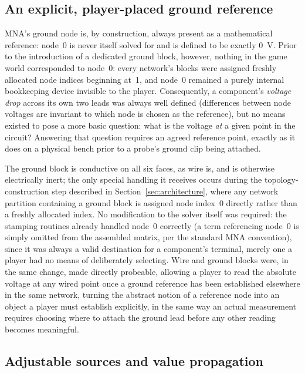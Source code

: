 \subsection{An explicit, player-placed ground reference}

MNA's ground node is, by construction, always present as a mathematical reference: node~0
is never itself solved for and is defined to be exactly $0$~V. Prior to the introduction of
a dedicated ground block, however, nothing in the game world corresponded to node~0: every
network's blocks were assigned freshly allocated node indices beginning at~1, and node~0
remained a purely internal bookkeeping device invisible to the player. Consequently, a
component's \emph{voltage drop} across its own two leads was always well defined
(differences between node voltages are invariant to which node is chosen as the reference),
but no means existed to pose a more basic question: what is the voltage \emph{at} a given
point in the circuit? Answering that question requires an agreed reference point, exactly as
it does on a physical bench prior to a probe's ground clip being attached.

The ground block is conductive on all six faces, as wire is, and is otherwise electrically
inert; the only special handling it receives occurs during the topology-construction step
described in Section~\ref{sec:architecture}, where any network partition containing a
ground block is assigned node index~0 directly rather than a freshly allocated index. No
modification to the solver itself was required: the stamping routines already handled
node~0 correctly (a term referencing node~0 is simply omitted from the assembled matrix,
per the standard MNA convention), since it was always a valid destination for a component's
terminal, merely one a player had no means of deliberately selecting. Wire and ground blocks
were, in the same change, made directly probeable, allowing a player to read the absolute
voltage at any wired point once a ground reference has been established elsewhere in the
same network, turning the abstract notion of a reference node into an object a player must
establish explicitly, in the same way an actual measurement requires choosing where to
attach the ground lead before any other reading becomes meaningful.

\subsection{Adjustable sources and value propagation}

